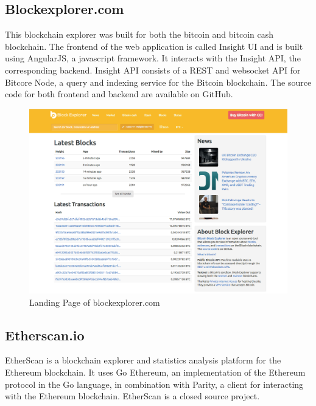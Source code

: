 \subsection{Blockexplorer.com}
This blockchain explorer was built for both the bitcoin and bitcoin cash blockchain. The frontend of the web application is called Insight UI and is built using AngularJS, a javascript framework. It interacts with the Insight API, the corresponding backend. Insight API consists of a REST and websocket API for Bitcore Node, a query and indexing service for the Bitcoin blockchain. The source code for both frontend and backend are available on GitHub.

\begin{figure}
  \includegraphics[width=\linewidth]{blockexplorer.png}
  \caption{Landing Page of blockexplorer.com}
  \label{fig:blockexplorer1}
\end{figure}

\subsection{Etherscan.io}
EtherScan is a blockchain explorer and statistics analysis platform for the Ethereum blockchain. It uses Go Ethereum, an implementation of the Ethereum protocol in the Go language, in combination with Parity, a client for interacting with the Ethereum blockchain. EtherScan is a closed source project.

